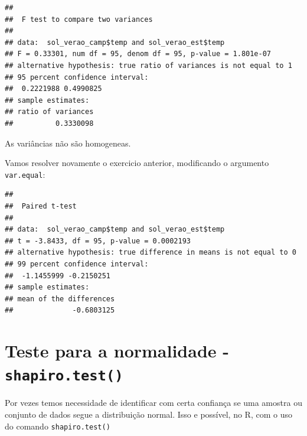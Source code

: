 \documentclass[
]{book}
\newenvironment{Shaded}{\begin{snugshade}}{\end{snugshade}}
\newcommand{\CommentTok}[1]{\textcolor[rgb]{0.56,0.35,0.01}{\textit{#1}}}
\newcommand{\DataTypeTok}[1]{\textcolor[rgb]{0.13,0.29,0.53}{#1}}
\newcommand{\FloatTok}[1]{\textcolor[rgb]{0.00,0.00,0.81}{#1}}
\newcommand{\KeywordTok}[1]{\textcolor[rgb]{0.13,0.29,0.53}{\textbf{#1}}}
\newcommand{\NormalTok}[1]{#1}
\newcommand{\OperatorTok}[1]{\textcolor[rgb]{0.81,0.36,0.00}{\textbf{#1}}}
\begin{document}
\begin{verbatim}
## 
##  F test to compare two variances
## 
## data:  sol_verao_camp$temp and sol_verao_est$temp
## F = 0.33301, num df = 95, denom df = 95, p-value = 1.801e-07
## alternative hypothesis: true ratio of variances is not equal to 1
## 95 percent confidence interval:
##  0.2221988 0.4990825
## sample estimates:
## ratio of variances 
##          0.3330098
\end{verbatim}

As variâncias não são homogeneas.

Vamos resolver novamente o exercicio anterior, modificando o argumento \texttt{var.equal}:

\begin{Shaded}
\end{Shaded}

\begin{verbatim}
## 
##  Paired t-test
## 
## data:  sol_verao_camp$temp and sol_verao_est$temp
## t = -3.8433, df = 95, p-value = 0.0002193
## alternative hypothesis: true difference in means is not equal to 0
## 99 percent confidence interval:
##  -1.1455999 -0.2150251
## sample estimates:
## mean of the differences 
##              -0.6803125
\end{verbatim}

\hypertarget{teste-para-a-normalidade---shapiro.test}{%
\section{\texorpdfstring{Teste para a normalidade - \texttt{shapiro.test()}}{Teste para a normalidade - shapiro.test()}}\label{teste-para-a-normalidade---shapiro.test}}

Por vezes temos necessidade de identificar com certa confiança se uma amostra ou conjunto de dados segue a distribuição normal. Isso e possível, no R, com o uso do comando \texttt{shapiro.test()}
\end{document}
